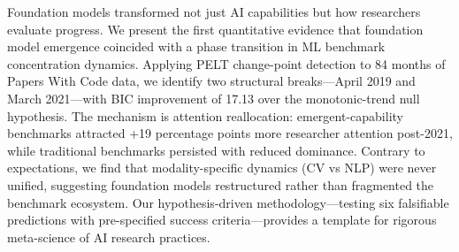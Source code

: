 Foundation models transformed not just AI capabilities but how researchers evaluate progress. We present the first quantitative evidence that foundation model emergence coincided with a phase transition in ML benchmark concentration dynamics. Applying PELT change-point detection to 84 months of Papers With Code data, we identify two structural breaks---April 2019 and March 2021---with BIC improvement of 17.13 over the monotonic-trend null hypothesis. The mechanism is attention reallocation: emergent-capability benchmarks attracted +19 percentage points more researcher attention post-2021, while traditional benchmarks persisted with reduced dominance. Contrary to expectations, we find that modality-specific dynamics (CV vs NLP) were never unified, suggesting foundation models restructured rather than fragmented the benchmark ecosystem. Our hypothesis-driven methodology---testing six falsifiable predictions with pre-specified success criteria---provides a template for rigorous meta-science of AI research practices.
